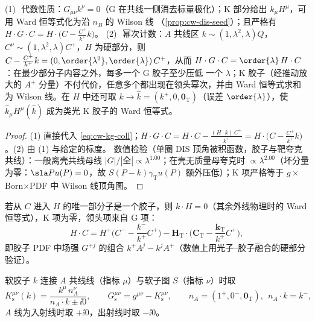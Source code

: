 \begin{proposition}[共线 K/G 分解的性质]\label{prop:cw-kg-coll}
(1)\,\tagR\ 代数性质：$G_{\mu\nu}k^\nu=0$（G 在共线一侧消去标量极化）；K 部分给出 $k_\mu H^\mu$，可用 Ward 恒等式化为沿 $n_B$ 的 Wilson 线
（\cref{prop:cw-dis-seed}）；且严格有 $H\cdot G\cdot C=H\cdot\big(C-\frac{C^+}{k^+}k\big)$。
(2)\,\tagA\ 幂次计数：$A$ 共线区 $k\sim(1,\lambda^2,\lambda)Q$，$C^\nu\sim(1,\lambda^2,\lambda)C^+$，$H$ 为硬部分，则
$C-\frac{C^+}{k^+}k=(0,\order{\lambda^2},\order{\lambda})\,C^+$，从而 $H\cdot G\cdot C=\order{\lambda}\,H\cdot C$：在最少部分子内容之外，每多一个 G 胶子至少压低
一个 $\lambda$；K 胶子（经推动放大的 $A^+$ 分量）不付代价，任意多个都出现在领头幂次，并由 Ward 恒等式求和为 Wilson 线。在 $H$ 中还可取
$k\to\hat k=(k^+,0,\bm 0_{\mathrm T})$（误差 $\order{\lambda}$），使 $\hat k_\mu H^\mu(\hat k)$ 成为类光 K 胶子的 Ward 恒等式。
\end{proposition}

\begin{proof}
(1) 直接代入 \cref{eq:cw-kg-coll}；$H\cdot G\cdot C=H\cdot C-\frac{(H\cdot k)\,C^+}{k^+}=H\cdot\big(C-\frac{C^+}{k^+}k\big)$。(2) 由 (1) 与给定的标度。
数值检验（单圈 DIS 顶角被积函数，胶子与靶夸克共线）：一般离壳共线母线 $|G|/|\text{全}|\propto\lambda^{1.00}$；在壳无质量母夸克时
$\propto\lambda^{2.00}$（坏分量为零：$\sla Pu(P)=0$，故 $S(P-k)\gamma_{\mathrm T}u(P)$ 额外压低）；K 项严格等于 $g\times$Born$\times$PDF 中 Wilson 线顶角图。
\end{proof}

\begin{remark}[胶子作为活动部分子]\label{rem:cw-gluon-active}
若从 $C$ 进入 $H$ 的唯一部分子是一个胶子，则 $k\cdot H=0$（其余外线物理时的 Ward 恒等式），K 项为零，领头项来自 G 项：
\begin{equation}\label{eq:cw-gluon-active}
H\cdot C=H^+\Big(C^--\frac{k^-}{k^+}C^+\Big)-\bm H_{\mathrm T}\cdot\Big(\bm C_{\mathrm T}-\frac{\bm k_{\mathrm T}}{k^+}C^+\Big),
\end{equation}
即胶子 PDF 中场强 $G^{+j}$ 的组合 $k^+A^j-k^jA^+$（数值上用光子–胶子融合的硬部分验证）。
\end{remark}

\begin{definition}[软连接的 K/G 分解]\label{def:cw-kg-soft}
软胶子 $k$ 连接 $A$ 共线线（指标 $\mu$）与软子图 $S$（指标 $\nu$）时取
\begin{equation}\label{eq:cw-kg-soft}
K^{\mu\nu}_{\mathrm s}(k)=\frac{k^\mu\,n_A^\nu}{n_A\cdot k\pm\ii0},\qquad G^{\mu\nu}_{\mathrm s}=g^{\mu\nu}-K^{\mu\nu}_{\mathrm s},\qquad
n_A=(1^+,0^-,\bm 0_{\mathrm T}),\ \ n_A\cdot k=k^-,
\end{equation}
$A$ 线为入射线时取 $+\ii0$，出射线时取 $-\ii0$。
\end{definition}

